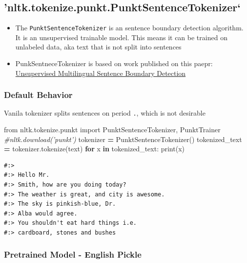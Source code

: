 \documentclass[
]{book}
\newenvironment{Shaded}{\begin{snugshade}}{\end{snugshade}}
\newcommand{\BuiltInTok}[1]{#1}
\newcommand{\CommentTok}[1]{\textcolor[rgb]{0.37,0.37,0.37}{\textit{#1}}}
\newcommand{\ControlFlowTok}[1]{\textcolor[rgb]{0.27,0.27,0.27}{\textbf{#1}}}
\newcommand{\ImportTok}[1]{#1}
\newcommand{\KeywordTok}[1]{\textcolor[rgb]{0.27,0.27,0.27}{\textbf{#1}}}
\newcommand{\NormalTok}[1]{#1}
\newcommand{\OperatorTok}[1]{\textcolor[rgb]{0.43,0.43,0.43}{\textbf{#1}}}
\providecommand{\tightlist}{%
  \setlength{\itemsep}{0pt}\setlength{\parskip}{0pt}}
\begin{document}
\hypertarget{nltk.tokenize.punkt.punktsentencetokenizer}{%
\subsection{'nltk.tokenize.punkt.PunktSentenceTokenizer`}\label{nltk.tokenize.punkt.punktsentencetokenizer}}

\begin{itemize}
\tightlist
\item
  The \texttt{PunktSentenceTokenizer} is an sentence boundary detection algorithm. It is an unsupervised trainable model. This means it can be trained on unlabeled data, aka text that is not split into sentences\\
\item
  PunkSentneceTokenizer is based on work published on this paepr: \href{https://www.mitpressjournals.org/doi/abs/10.1162/coli.2006.32.4.485\#.V2ouLXUrLeQ}{Unsupervised Multilingual Sentence Boundary Detection}
\end{itemize}

\hypertarget{default-behavior}{%
\subsubsection{Default Behavior}\label{default-behavior}}

Vanila tokenizer splits sentences on period \texttt{.}, which is not desirable

\begin{Shaded}
\begin{Highlighting}[]
\ImportTok{from}\NormalTok{ nltk.tokenize.punkt }\ImportTok{import}\NormalTok{ PunktSentenceTokenizer, PunktTrainer}
\CommentTok{#nltk.download('punkt')}
\NormalTok{tokenizer }\OperatorTok{=}\NormalTok{ PunktSentenceTokenizer()}
\NormalTok{tokenized_text }\OperatorTok{=}\NormalTok{ tokenizer.tokenize(text) }
\ControlFlowTok{for}\NormalTok{ x }\KeywordTok{in}\NormalTok{ tokenized_text:}
  \BuiltInTok{print}\NormalTok{(x) }
\end{Highlighting}
\end{Shaded}

\begin{verbatim}
#:> 
#:> Hello Mr.
#:> Smith, how are you doing today?
#:> The weather is great, and city is awesome.
#:> The sky is pinkish-blue, Dr.
#:> Alba would agree.
#:> You shouldn't eat hard things i.e.
#:> cardboard, stones and bushes
\end{verbatim}

\hypertarget{pretrained-model---english-pickle}{%
\subsubsection{Pretrained Model - English Pickle}\label{pretrained-model---english-pickle}}
\end{document}
